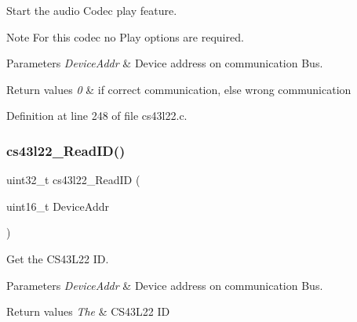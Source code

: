 Start the audio Codec play feature. 

\begin{DoxyNote}{Note}
For this codec no Play options are required. 
\end{DoxyNote}

\begin{DoxyParams}{Parameters}
{\em Device\+Addr} & Device address on communication Bus. ~\newline
\\
\hline
\end{DoxyParams}

\begin{DoxyRetVals}{Return values}
{\em 0} & if correct communication, else wrong communication \\
\hline
\end{DoxyRetVals}


Definition at line 248 of file cs43l22.\+c.

\mbox{\label{group___c_s43_l22___private___functions_gad4e4e8b889500f0e64c546a31d4b6dca}} 
\subsubsection{\texorpdfstring{cs43l22\+\_\+\+Read\+I\+D()}{cs43l22\_ReadID()}}
{\footnotesize\ttfamily uint32\+\_\+t cs43l22\+\_\+\+Read\+ID (\begin{DoxyParamCaption}\item[{uint16\+\_\+t}]{Device\+Addr }\end{DoxyParamCaption})}



Get the C\+S43\+L22 ID. 


\begin{DoxyParams}{Parameters}
{\em Device\+Addr} & Device address on communication Bus. ~\newline
\\
\hline
\end{DoxyParams}

\begin{DoxyRetVals}{Return values}
{\em The} & C\+S43\+L22 ID \\
\hline
\end{DoxyRetVals}



